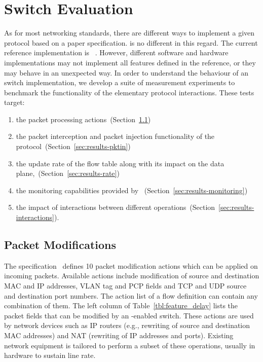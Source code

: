 \section{Switch Evaluation}\label{sec:oflops-result}

As for most networking standards, there are different ways to implement a given
protocol based on a paper specification. \of is no different in this regard. The
current \of reference implementation is \ovs~. However,
different software and hardware implementations may not implement all features
defined in the \ovs reference, or they may behave in an unexpected way. In order
to understand the behaviour of an \of switch implementation, we develop a suite of
measurement experiments to benchmark the functionality of the elementary
protocol interactions.  These tests target: 
\begin{enumerate}
  \item  the \of packet processing actions~(Section~\ref{sec:results-packets})
  \item the packet interception and packet injection functionality of the
        protocol~(Section~\ref{sec:results-pktin})
  \item the update rate of the \of flow table along with its impact on the data
        plane,~(Section~\ref{sec:results-rate})
  \item the monitoring capabilities provided by
        \of~(Section~\ref{sec:results-monitoring})
  \item the impact of interactions between different \of
        operations~(Section~\ref{sec:results-interactions}).  
\end{enumerate}


\subsection{Packet Modifications}\label{sec:results-packets}

The  specification~ defines 10 packet modification
actions which can be applied on incoming packets. Available actions include
modification of source and destination MAC and IP addresses, VLAN tag and PCP
fields and TCP and UDP source and destination port numbers. The action list
of a flow definition can contain any combination of them. The left column of
Table~\ref{tbl:feature_delay} lists the packet fields that can be modified by an
\of-enabled switch.  These actions are used by network devices such as IP
routers (e.g., rewriting of source and destination MAC addresses) and NAT
(rewriting of IP addresses and ports). Existing network equipment is tailored to
perform a subset of these operations, usually in hardware to sustain line rate.

